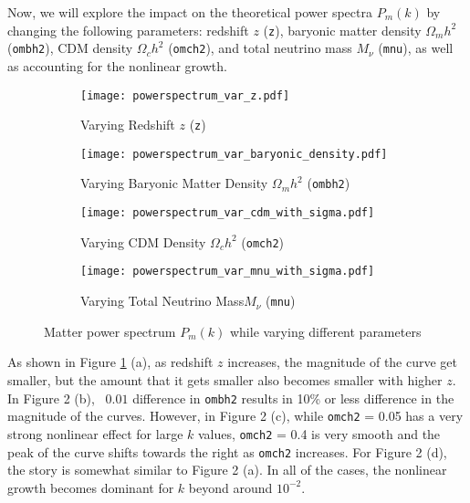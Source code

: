 \documentclass[11pt, letterpaper, twoside]{article}
\begin{document}
Now, we will explore the impact on the theoretical power spectra $P_m(k)$ by changing the following parameters: redshift $z$ (\verb|z|), baryonic matter density $\Omega_m h^2$ (\verb|ombh2|), CDM density $\Omega_c h^2$ (\verb|omch2|), and total neutrino mass $M_\nu$ (\verb|mnu|), as well as accounting for the nonlinear growth.

\begin{figure}[h!]
    \centering
    \begin{subfigure}[b]{0.49\textwidth}
        \texttt{[image: powerspectrum\_var\_z.pdf]}
        \cprotect\caption{Varying Redshift $z$ (\verb|z|)}
    \end{subfigure}
    \begin{subfigure}[b]{0.49\textwidth}
        \texttt{[image: powerspectrum\_var\_baryonic\_density.pdf]}
        \cprotect\caption{Varying Baryonic Matter Density $\Omega_m h^2$ (\verb|ombh2|)}
    \end{subfigure}
    \begin{subfigure}[b]{0.49\textwidth}
        \texttt{[image: powerspectrum\_var\_cdm\_with\_sigma.pdf]}
        \cprotect\caption{Varying CDM Density $\Omega_c h^2$ (\verb|omch2|)}
    \end{subfigure}
    \begin{subfigure}[b]{0.49\textwidth}
        \texttt{[image: powerspectrum\_var\_mnu\_with\_sigma.pdf]}
        \cprotect\caption{Varying Total Neutrino Mass$M_\nu$ (\verb|mnu|)}
    \end{subfigure}
    \caption{Matter power spectrum $P_m(k)$ while varying different parameters}
    \label{fig:powerspectrum_var_par}
\end{figure}

As shown in Figure \ref{fig:powerspectrum_var_par} (a), as redshift $z$ increases, the magnitude of the curve get smaller, but the amount that it gets smaller also becomes smaller with higher $z$. In Figure 2 (b), ~$0.01$ difference in \verb|ombh2| results in 10\% or less difference in the magnitude of the curves. However, in Figure 2 (c), while \verb|omch2| = 0.05 has a very strong nonlinear effect for large $k$ values, \verb|omch2| = 0.4 is very smooth and the peak of the curve shifts towards the right as \verb|omch2| increases. For Figure 2 (d), the story is somewhat similar to Figure 2 (a). In all of the cases, the nonlinear growth becomes dominant for $k$ beyond around $10^{-2}$. \\
\end{document}
